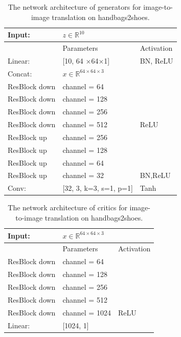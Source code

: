 \documentclass[runningheads]{llncs}
\begin{document}
\begin{table}
	\vspace{-40pt}
	\centering
	\caption{The network architecture of generators for image-to-image translation on handbags2shoes.}
	\vspace{3pt}
	\begin{tabular}{lll}
		\toprule[2pt]
		Input: & $z \in \mathbb{R}^{10}$ & \\
		\hline
		& Parameters & Activation \\
		\hline
		Linear: & [10, 64 $\times$64$\times$1] & BN, ReLU \\
		\hline
		Concat: & $x \in \mathbb{R}^{64\times64\times3}$ \\
		\hline 
		ResBlock down & channel = 64 \\
		\hline 
		ResBlock down & channel = 128 \\
		\hline 
		ResBlock down & channel = 256 \\
		\hline 
		ResBlock down & channel = 512 & ReLU \\
		\hline 
		ResBlock up & channel = 256 & \\
		\hline 
		ResBlock up & channel = 128 & \\
		\hline 
		ResBlock up & channel = 64 & \\
		\hline 
		ResBlock up & channel = 32 & BN,ReLU \\
		\hline
		Conv: & [32, 3, k=3, s=1, p=1] & Tanh \\
		\bottomrule[2pt]
	\end{tabular}
	\label{image2image_translation_generator_snres}
\end{table}

\begin{table}
	\centering
	\caption{The network architecture of critics for image-to-image translation on handbags2shoes.}
	\vspace{3pt}
	\begin{tabular}{lll}
		\toprule[2pt]
		Input: & $x \in \mathbb{R}^{64\times64\times3}$ \\
		\hline 
		& Parameters & Activation \\
		\hline
		ResBlock down & channel = 64 \\
		\hline 
		ResBlock down & channel = 128 \\
		\hline 
		ResBlock down & channel = 256 \\
		\hline 
		ResBlock down & channel = 512 \\
		\hline 
		ResBlock down & channel = 1024 & ReLU \\
		\hline 
		Linear: & [1024, 1] \\
		\bottomrule[2pt]
	\end{tabular}
	\label{image2image_translation_discriminator_snres}
\end{table}
\end{document}
